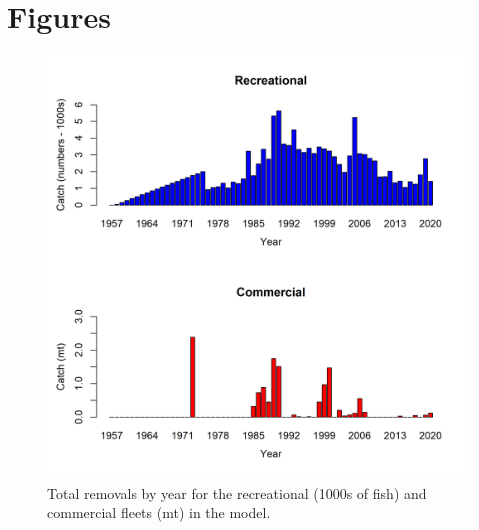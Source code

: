 \documentclass[11pt,
  english,
  letterpaper,
]{article}
\begin{document}
\newpage



\newpage





\newpage

\clearpage


\hypertarget{figures}{%
\section{Figures}\label{figures}}

\leavevmode\tagmcend\tagstructend


\begin{figure}
\centering
\includegraphics[width=1\textwidth,height=1\textheight]{figs/catches_wa.png}
\caption{Total removals by year for the recreational (1000s of fish) and commercial fleets (mt) in the model.\label{fig:catch}}
\end{figure}
\end{document}
